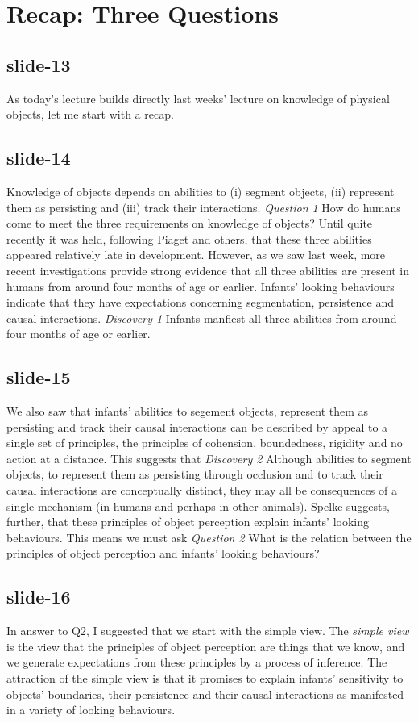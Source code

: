 \documentclass[12pt,\papersize]{extarticle}
\begin{document}
\section{Recap: Three Questions}
 
 
\subsection{slide-13}
As today's lecture builds directly last weeks' lecture on knowledge of physical objects, let me start with a recap.
 
 
\subsection{slide-14}
Knowledge of objects depends on abilities to (i) segment objects, (ii) represent them as persisting and (iii) track their interactions.
\emph{Question 1} How do humans come to meet the three requirements on knowledge of objects?
Until quite recently it was held, following Piaget and others, that these three abilities appeared relatively late in development.
However, as we saw last week, more recent investigations provide strong evidence that all three abilities are present in humans from around four months of age or earlier.
Infants' looking behaviours indicate that they have expectations concerning segmentation, persistence and causal interactions.
\emph{Discovery 1} Infants manfiest all three abilities from around four months of age or earlier.
 
 
\subsection{slide-15}
We also saw that infants' abilities to segement objects, represent them as persisting and track their causal interactions can be described by appeal to a single set of principles, the principles of cohension, boundedness, rigidity and no action at a distance.
This suggests that \emph{Discovery 2} Although abilities to segment objects, to represent them as persisting through occlusion and to track their causal interactions are conceptually distinct, they may all be consequences of a single mechanism (in humans and perhaps in other animals).
Spelke suggests, further, that these principles of object perception explain infants' looking behaviours.
This means we must ask \emph{Question 2} What is the relation between the principles of object perception and infants’ looking behaviours?
 
 
\subsection{slide-16}
In answer to Q2, I suggested that we start with the simple view.
The \emph{simple view} is the view that the principles of object perception are things that we know, and we generate expectations from these principles by a process of inference.
The attraction of the simple view is that it promises to explain infants' sensitivity to objects' boundaries, their persistence and their causal interactions as manifested in a variety of looking behaviours.
 
\end{document}
